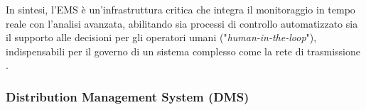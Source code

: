 In sintesi, l'EMS è un'infrastruttura critica che integra il monitoraggio in tempo reale con l'analisi avanzata, abilitando sia processi di controllo automatizzato sia il supporto alle decisioni per gli operatori umani ("\textit{human-in-the-loop}"), indispensabili per il governo di un sistema complesso come la rete di trasmissione \cite{enelx-EMS}.

\newpage
\subsubsection{Distribution Management System (DMS)}



    
    


